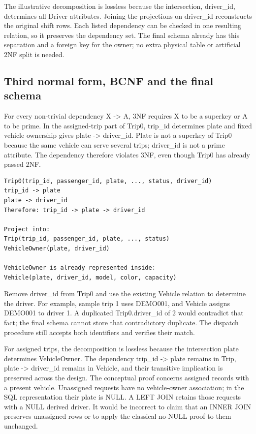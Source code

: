 \documentclass[11pt,a4paper]{article}
\begin{document}
The illustrative decomposition is lossless because the intersection, driver\_\allowbreak{}id, determines all Driver attributes. Joining the projections on driver\_\allowbreak{}id reconstructs the original shift rows. Each listed dependency can be checked in one resulting relation, so it preserves the dependency set. The final schema already has this separation and a foreign key for the owner; no extra physical table or artificial 2NF split is needed.

\subsection{Third normal form, BCNF and the final schema}
For every non-trivial dependency X -> A, 3NF requires X to be a superkey or A to be prime. In the assigned-trip part of Trip0, trip\_\allowbreak{}id determines plate and fixed vehicle ownership gives plate -> driver\_\allowbreak{}id. Plate is not a superkey of Trip0 because the same vehicle can serve several trips; driver\_\allowbreak{}id is not a prime attribute. The dependency therefore violates 3NF, even though Trip0 has already passed 2NF.

\begin{lstlisting}
Trip0(trip_id, passenger_id, plate, ..., status, driver_id)
trip_id -> plate
plate -> driver_id
Therefore: trip_id -> plate -> driver_id

Project into:
Trip(trip_id, passenger_id, plate, ..., status)
VehicleOwner(plate, driver_id)

VehicleOwner is already represented inside:
Vehicle(plate, driver_id, model, color, capacity)
\end{lstlisting}
Remove driver\_\allowbreak{}id from Trip0 and use the existing Vehicle relation to determine the driver. For example, sample trip 1 uses DEMO001, and Vehicle assigns DEMO001 to driver 1. A duplicated Trip0.driver\_\allowbreak{}id of 2 would contradict that fact; the final schema cannot store that contradictory duplicate. The dispatch procedure still accepts both identifiers and verifies their match.

For assigned trips, the decomposition is lossless because the intersection {plate} determines VehicleOwner. The dependency trip\_\allowbreak{}id -> plate remains in Trip, plate -> driver\_\allowbreak{}id remains in Vehicle, and their transitive implication is preserved across the design. The conceptual proof concerns assigned records with a present vehicle. Unassigned requests have no vehicle-owner association; in the SQL representation their plate is NULL. A LEFT JOIN retains those requests with a NULL derived driver. It would be incorrect to claim that an INNER JOIN preserves unassigned rows or to apply the classical no-NULL proof to them unchanged.
\end{document}
